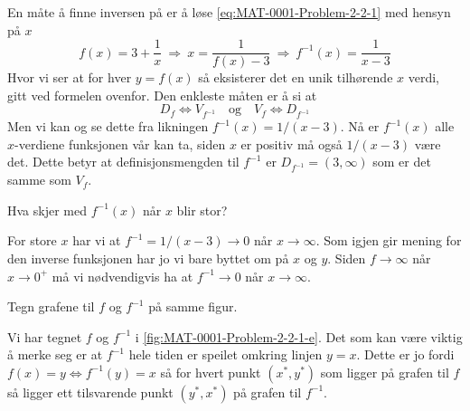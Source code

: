 \documentclass[a4paper,11pt]{article}
\begin{document}
\begin{solution}
    En måte å finne inversen på er å løse \cref{eq:MAT-0001-Problem-2-2-1} med hensyn på $x$
    \begin{equation}
        f(x) = 3 + \frac{1}{x} \ \Rightarrow \ 
        x = \frac{1}{f(x) - 3} \ \Rightarrow \ 
        f^{-1}(x) = \frac{1}{x - 3}
    \end{equation}
    Hvor vi ser at for hver $y = f(x)$ så eksisterer det en unik tilhørende $x$ verdi, gitt ved
    formelen ovenfor. Den enkleste måten er å si at
    \begin{equation}
        D_f \Leftrightarrow V_{f^{-1}} 
        \quad \text{og} \quad 
        V_f \Leftrightarrow D_{f^{-1}} 
    \end{equation}
    Men vi kan og se dette fra likningen $f^{-1}(x) = 1/(x - 3)$. Nå er $f^{-1}(x)$ alle
    $x$-verdiene funksjonen vår kan ta, siden $x$ er positiv må også $1/(x - 3)$ være det.
    Dette betyr at definisjonsmengden til $f^{-1}$ er $D_{f^{-1}} = (3, \infty)$ som er det
    samme som $V_f$.
\end{solution}

\begin{subproblem}
    Hva skjer med $f^{-1}(x)$ når $x$ blir stor?    
\end{subproblem}

\begin{solution}
    For store $x$ har vi at $f^{-1} = 1/(x -3) \to 0$ når $x \to \infty$.
    Som igjen gir mening for den inverse funksjonen har jo vi bare byttet om 
    på $x$ og $y$. Siden $f \to \infty$ når $x \to 0^+$ må vi nødvendigvis ha
    at $f^{-1} \to 0$ når $x \to \infty$.
\end{solution}

\begin{subproblem}
    Tegn grafene til $f$ og $f^{-1}$ på samme figur.
\end{subproblem}

\begin{solution}
    Vi har tegnet $f$ og $f^{-1}$ i \cref{fig:MAT-0001-Problem-2-2-1-e}.
    Det som kan være viktig å merke seg er at $f^{-1}$ hele tiden er 
    speilet omkring linjen $y = x$. Dette er jo fordi 
    $f(x) = y \Leftrightarrow f^{-1}(y) = x$ så for hvert punkt $(x^*, y^*)$
    som ligger på grafen til $f$ så ligger ett tilsvarende punkt $(y^*, x^*)$
    på grafen til $f^{-1}$.
\end{solution}
\end{document}
